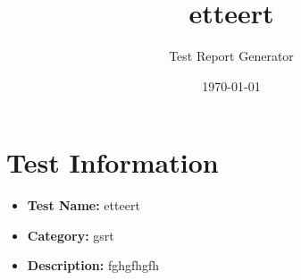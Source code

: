 \documentclass{article}
\title{etteert}
\author{Test Report Generator}
\date{\today}
\begin{document}
\maketitle

\section{Test Information}
\begin{itemize}
    \item \textbf{Test Name:} etteert
    \item \textbf{Category:} gsrt
    \item \textbf{Description:} fghgfhgfh
\end{itemize}
\end{document}

